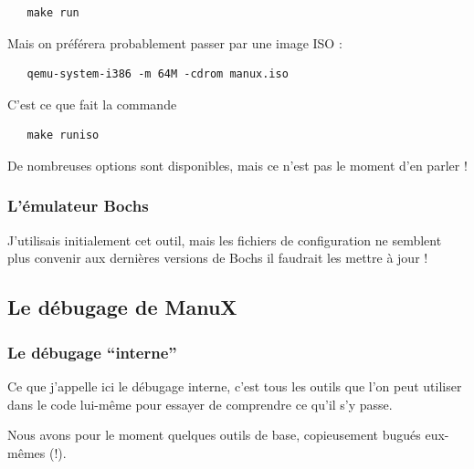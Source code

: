 \begin{lstlisting}
   make run
\end{lstlisting}

   Mais on préférera probablement passer par une image ISO :

\begin{lstlisting}
   qemu-system-i386 -m 64M -cdrom manux.iso
\end{lstlisting}

  C'est ce que fait la commande

\begin{lstlisting}
   make runiso
\end{lstlisting}

   De nombreuses options sont disponibles, mais ce n'est pas le moment
d'en parler !

%
\subsubsection{L'émulateur Bochs}

   J'utilisais initialement cet outil, mais les fichiers de
configuration ne semblent plus convenir aux dernières versions de
Bochs {} \cite{bochs-website} il faudrait les mettre à jour !

%
\subsection{Le débugage de ManuX}

%
\subsubsection{Le débugage ``interne''}
\label{subsection:debugage_interne}

   Ce que j'appelle ici le débugage interne, c'est tous les outils que
l'on peut utiliser dans le code lui-même pour essayer de comprendre ce
qu'il s'y passe.

   Nous avons pour le moment quelques outils de base, copieusement bugués
eux-mêmes (!).

